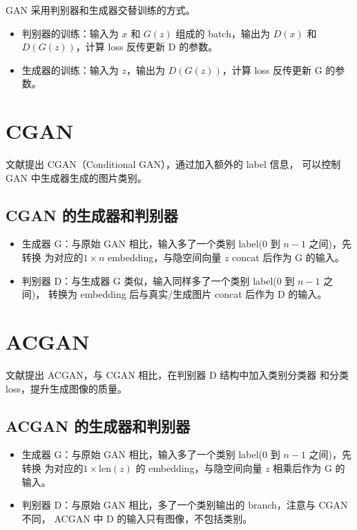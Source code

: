 GAN 采用判别器和生成器交替训练的方式。

\begin{itemize}
  \item 判别器的训练：输入为 $x$ 和 $G(z)$ 组成的 batch，输出为 $D(x)$ 和
    $D(G(z))$，计算 loss 反传更新 D 的参数。
  \item 生成器的训练：输入为 $z$，输出为 $D(G(z))$，计算 loss 反传更新 G 的参数。
\end{itemize}

\section{CGAN}
文献提出 CGAN（Conditional GAN），通过加入额外的 label 信息，
可以控制 GAN 中生成器生成的图片类别。

\subsection{CGAN 的生成器和判别器}
\begin{itemize}
  \item 生成器 G：与原始 GAN 相比，输入多了一个类别 label(0 到 $n-1$ 之间)，先转换
    为对应的$1 \times n$ embedding，与隐空间向量 $z$ concat 后作为 G 的输入。
  \item 判别器 D：与生成器 G 类似，输入同样多了一个类别 label(0 到 $n-1$ 之间)，
    转换为 embedding 后与真实/生成图片 concat 后作为 D 的输入。
\end{itemize}

\section{ACGAN}
文献提出 ACGAN，与 CGAN 相比，在判别器 D 结构中加入类别分类器
和分类 loss，提升生成图像的质量。

\subsection{ACGAN 的生成器和判别器}
\begin{itemize}
  \item 生成器 G：与原始 GAN 相比，输入多了一个类别 label(0 到 $n-1$ 之间)，先转换
    为对应的$1 \times \mathrm{len}(z)$ 的 embedding，与隐空间向量 $z$ 相乘后作为 G
    的输入。
  \item 判别器 D：与原始 GAN 相比，多了一个类别输出的 branch，注意与 CGAN 不同，
    ACGAN 中 D 的输入只有图像，不包括类别。
\end{itemize}

